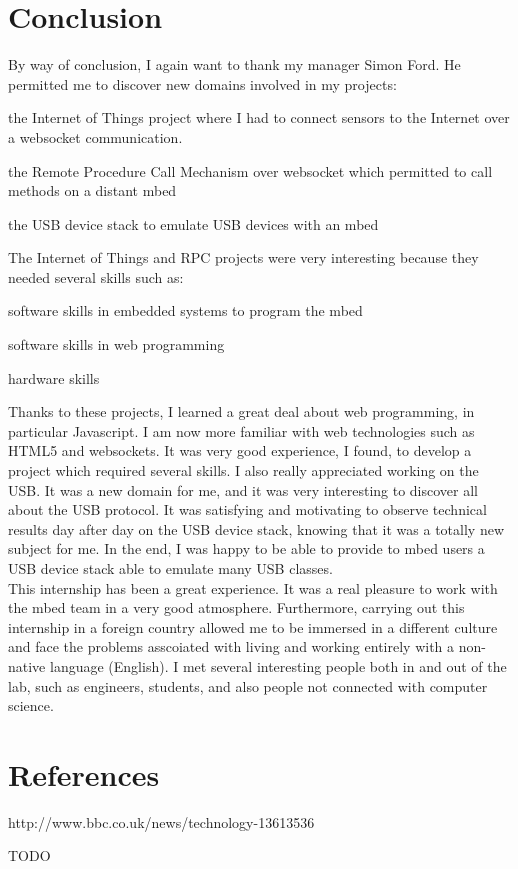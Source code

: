 \documentclass[pdftex,10pt,a4paper]{report}
\newenvironment{packed_item}{
\begin{itemize}
  \setlength{\itemsep}{1pt}
  \setlength{\parskip}{0pt}
  \setlength{\parsep}{0pt}
}{\end{itemize}}
\begin{document}
\chapter*{Conclusion}
By way of conclusion, I again want to thank my manager Simon Ford. He permitted me to discover new domains involved in my projects:
\begin{packed_item}
	\item the Internet of Things project where I had to connect sensors to the Internet over a websocket communication. 
	\item the Remote Procedure Call Mechanism over websocket which permitted to call methods on a distant mbed
	\item the USB device stack to emulate USB devices with an mbed
\end{packed_item}

The Internet of Things and RPC projects were very interesting because they needed several skills such as:
\begin{packed_item}
	\item software skills in embedded systems to program the mbed
	\item software skills in web programming
	\item hardware skills
\end{packed_item}


Thanks to these projects, I learned a great deal about web programming, in particular Javascript. I am now more familiar with web technologies such as HTML5 and websockets. It was very good experience, I found, to develop a project which required several skills. I also really appreciated working on the USB. It was a new domain for me, and it was very interesting to discover all about the USB protocol. It was satisfying and motivating to observe technical results day after day on the USB device stack, knowing that it was a totally new subject for me. In the end, I was happy to be able to provide to mbed users a USB device stack able to emulate many USB classes. \\


This internship has been a great experience. It was a real pleasure to work with the mbed team in a very good atmosphere. Furthermore, carrying out this
internship in a foreign country allowed me to be immersed in a different culture and face the problems asscoiated with living and working entirely with a non-native language (English). I met several
interesting people both in and out of the lab, such as engineers, students, and also people not connected with computer science.




\chapter*{References}
http://www.bbc.co.uk/news/technology-13613536

TODO
\end{document}
